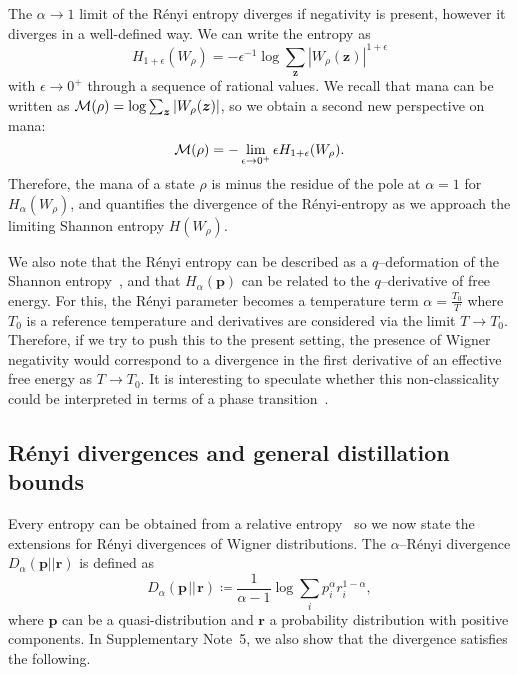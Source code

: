 \documentclass[
onecolumn,
superscriptaddress
]{revtex4-1}
\def\z{\boldsymbol{z}}
\def\r{\boldsymbol{r}}
\def\p{\boldsymbol{p}}
\def\M{{\cal M}}
\begin{document}
The $\alpha \rightarrow 1$ limit of the R\'{e}nyi entropy diverges if negativity is present, however it diverges in a well-defined way. We can write the entropy as 
\begin{equation}
	H_{1+\epsilon}(W_\rho) = -\epsilon^{-1} \log \sum_{\z} |W_\rho (\z)|^{1+\epsilon}
\end{equation} 
with $\epsilon \rightarrow 0^+$ through a sequence of rational values. We recall that mana can be written as $\M(\rho) = \log \sum_{\z} |W_\rho(\z)|$, so we obtain a second new perspective on mana:
\begin{equation}\label{eq:mana-divergence}
\M(\rho) = -\lim_{\epsilon \rightarrow 0^+} \epsilon H_{1+\epsilon}(W_\rho).
\end{equation}
Therefore, the mana of a state $\rho$ is minus the residue of the pole at $\alpha=1$ for $H_\alpha(W_\rho)$, and quantifies the divergence of the R\'{e}nyi-entropy as we approach the limiting Shannon entropy $H(W_\rho)$. 

We also note that the R\'{e}nyi entropy can be described as a $q$--deformation of the Shannon entropy~\cite{baez2011renyi}, and that $H_\alpha(\p)$ can be related to the $q$--derivative of free energy.  For this, the R\'{e}nyi parameter becomes a temperature term $\alpha = \frac{T_0}{T}$ where $T_0$ is a reference temperature and derivatives are considered via the limit $T \rightarrow T_0$. Therefore, if we try to push this to the present setting, the presence of Wigner negativity would correspond to a divergence in the first derivative of an effective free energy as $T \rightarrow T_0$. It is interesting to speculate whether this non-classicality could be interpreted in terms of a phase transition~\cite{domb2000phase}.

\subsection*{R\'{e}nyi divergences and general distillation bounds}
Every entropy can be obtained from a relative entropy~\cite{Gour_2020} so we now state the extensions for R\'{e}nyi divergences of Wigner distributions.
The $\alpha$--R\'{e}nyi divergence $D_\alpha(\p||\r)$ is defined as
\begin{equation}\label{eq:D}
	D_\alpha(\p \hspace{1pt}||\hspace{1pt} \r) \coloneqq \frac{1}{\alpha-1} \log \sum_i p_i^\alpha r_i^{1-\alpha},
\end{equation}
where $\p$ can be a quasi-distribution and $\r$ a probability distribution with positive components. In Supplementary Note~5, we also show that the divergence satisfies the following.
\end{document}
